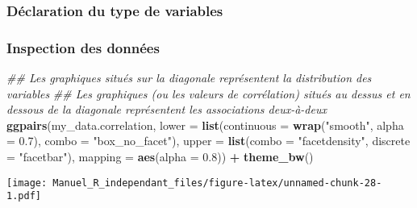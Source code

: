 \documentclass[
]{book}
\newenvironment{Shaded}{\begin{snugshade}}{\end{snugshade}}
\newcommand{\CommentTok}[1]{\textcolor[rgb]{0.56,0.35,0.01}{\textit{#1}}}
\newcommand{\DataTypeTok}[1]{\textcolor[rgb]{0.13,0.29,0.53}{#1}}
\newcommand{\FloatTok}[1]{\textcolor[rgb]{0.00,0.00,0.81}{#1}}
\newcommand{\KeywordTok}[1]{\textcolor[rgb]{0.13,0.29,0.53}{\textbf{#1}}}
\newcommand{\NormalTok}[1]{#1}
\newcommand{\OperatorTok}[1]{\textcolor[rgb]{0.81,0.36,0.00}{\textbf{#1}}}
\newcommand{\StringTok}[1]{\textcolor[rgb]{0.31,0.60,0.02}{#1}}
\begin{document}
\hypertarget{duxe9claration-du-type-de-variables-1}{%
\subsubsection{Déclaration du type de variables}\label{duxe9claration-du-type-de-variables-1}}

\begin{Shaded}
\end{Shaded}

\hypertarget{inspection-des-donnuxe9es-1}{%
\subsubsection{Inspection des données}\label{inspection-des-donnuxe9es-1}}

\begin{Shaded}
\begin{Highlighting}[]
\CommentTok{## Les graphiques situés sur la diagonale représentent la distribution des variables}
\CommentTok{## Les graphiques (ou les valeurs de corrélation) situés au dessus et en dessous de la diagonale représentent les associations deux-à-deux}
\KeywordTok{ggpairs}\NormalTok{(my_data.correlation,}
        \DataTypeTok{lower =} \KeywordTok{list}\NormalTok{(}\DataTypeTok{continuous =} \KeywordTok{wrap}\NormalTok{(}\StringTok{"smooth"}\NormalTok{, }\DataTypeTok{alpha =} \FloatTok{0.7}\NormalTok{), }\DataTypeTok{combo =} \StringTok{"box_no_facet"}\NormalTok{),}
        \DataTypeTok{upper =} \KeywordTok{list}\NormalTok{(}\DataTypeTok{combo =} \StringTok{"facetdensity"}\NormalTok{, }\DataTypeTok{discrete =} \StringTok{"facetbar"}\NormalTok{), }
        \DataTypeTok{mapping =} \KeywordTok{aes}\NormalTok{(}\DataTypeTok{alpha =} \FloatTok{0.8}\NormalTok{)) }\OperatorTok{+}\StringTok{ }\KeywordTok{theme_bw}\NormalTok{()}
\end{Highlighting}
\end{Shaded}

\texttt{[image: Manuel\_R\_independant\_files/figure-latex/unnamed-chunk-28-1.pdf]}
\end{document}
